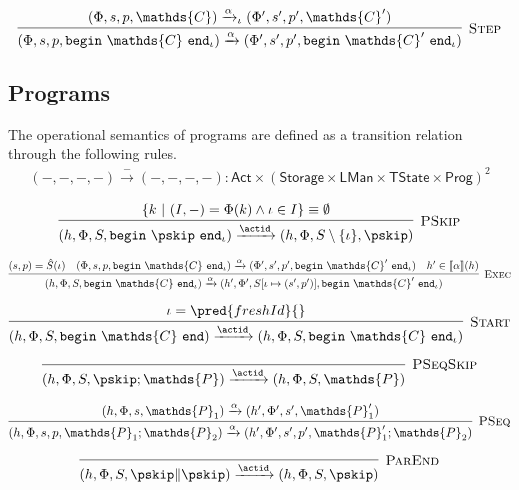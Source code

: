\[
\infer[\textsc{Step}]
{
	(\Phi, s, p, \mathtt{begin}\ \mathds{C}\ \mathtt{end}_\iota)
	\xrightarrow{\alpha}
	(\Phi', s', p', \mathtt{begin}\ \mathds{C}'\ \mathtt{end}_\iota)
}
{
	(\Phi, s, p, \mathds{C})
	\xrightarrow{\alpha}_\iota
	(\Phi', s', p', \mathds{C}')
}
\]

\subsection{Programs}


The operational semantics of programs are defined as a transition relation through the following rules.
\begin{gather*}
(-, -, -, -) \xrightarrow{-} (-, -, -, -) 
: \mathsf{Act} \times (\mathsf{Storage} \times \mathsf{LMan} \times \mathsf{TState} \times \mathsf{Prog})^2
\end{gather*}

\[
\infer[\textsc{PSkip}]
{
	 (h, \Phi, S, \mathtt{begin}\ \pskip\ \mathtt{end}_\iota)
	\xrightarrow{\actid}
	(h, \Phi, S \setminus \{\iota\}, \pskip)
}
{
	\{ k\ |\ (I, -) = \Phi(k) \land \iota \in I \} \equiv \emptyset
}
\]

\[
\infer[\textsc{Exec}]
{
	 (h, \Phi, S, \mathtt{begin}\ \mathds{C}\ \mathtt{end}_\iota)
	\xrightarrow{\alpha}
	(h', \Phi', S[\iota \mapsto (s', p')], \mathtt{begin}\ \mathds{C}'\ \mathtt{end}_\iota)
}
{
	(s, p) = \hat{S}(\iota) &
	(\Phi, s, p, \mathtt{begin}\ \mathds{C}\ \mathtt{end}_\iota)
	\xrightarrow{\alpha}
	(\Phi', s', p', \mathtt{begin}\ \mathds{C}'\ \mathtt{end}_\iota) &
	h' \in \llbracket \alpha \rrbracket (h)
}
\]

\[
\infer[\textsc{Start}]
{
	(h, \Phi, S, \mathtt{begin}\ \mathds{C}\ \mathtt{end})
	\xrightarrow{\actid}
	(h, \Phi, S, \mathtt{begin}\ \mathds{C}\ \mathtt{end}_\iota)
}
{
	\iota = \pred{freshId}{}
}
\]

\[
\infer[\textsc{PSeqSkip}]
{
	 (h, \Phi, S, \pskip; \mathds{P})
	\xrightarrow{\actid}
	(h, \Phi, S, \mathds{P})
}
{}
\]

\[
\infer[\textsc{PSeq}]
{
	 (h, \Phi, s, p, \mathds{P}_1; \mathds{P}_2)
	\xrightarrow{\alpha}
	(h', \Phi', s', p', \mathds{P}_1'; \mathds{P}_2)
}
{
	 (h, \Phi, s, \mathds{P}_1)
	\xrightarrow{\alpha}
	(h', \Phi', s', \mathds{P}_1')
}
\]

\[
\infer[\textsc{ParEnd}]
{
	 (h, \Phi, S, \pskip \| \pskip)
	\xrightarrow{\actid}
	(h, \Phi, S, \pskip)
}
{}
\]

